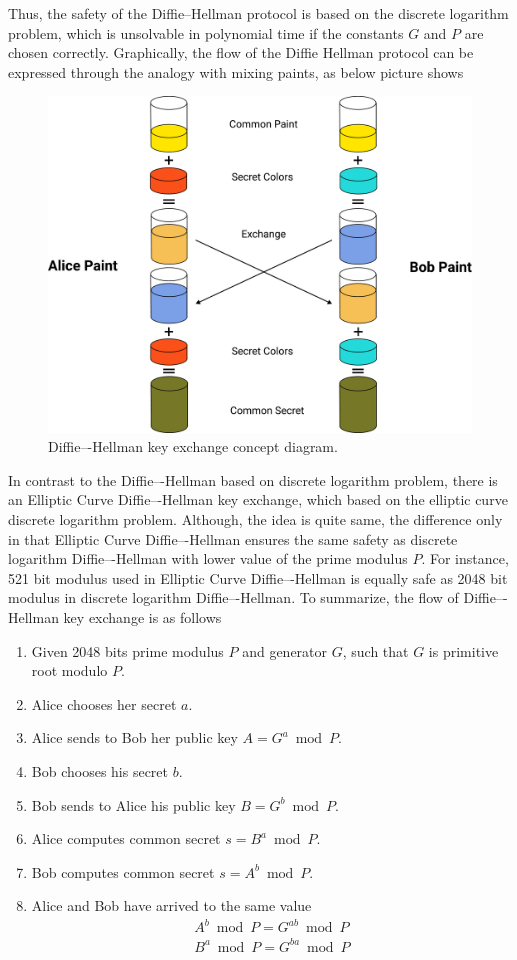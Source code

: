 Thus, the safety of the Diffie--Hellman protocol is based on the discrete logarithm problem, which is unsolvable
in polynomial time if the constants $G$ and $P$ are chosen correctly.
Graphically, the flow of the Diffie Hellman protocol can be expressed through the
analogy with mixing paints, as below picture shows
\begin{figure}[H]
    \centering
    \includegraphics[width=1\textwidth]{Pictures/07_Diffie-Hellman_keyexchange_concept_diagram}
    \caption{Diffie–-Hellman key exchange concept diagram.}\label{fig:figure4}
\end{figure}
In contrast to the Diffie–-Hellman based on discrete logarithm problem, there is an Elliptic Curve Diffie–-Hellman
key exchange, which based on the elliptic curve discrete logarithm problem.
Although, the idea is quite same, the difference only in that Elliptic Curve Diffie–-Hellman ensures the same safety
as discrete logarithm Diffie–-Hellman with lower value of the prime modulus $P$.
For instance, 521 bit modulus used in Elliptic Curve Diffie–-Hellman is equally safe as 2048 bit modulus in
discrete logarithm Diffie–-Hellman.
To summarize, the flow of Diffie–-Hellman key exchange is as follows
\begin{enumerate}
    \item Given 2048 bits prime modulus $P$ and generator $G$, such that $G$ is primitive root modulo $P$.
    \item Alice chooses her secret $a$.
    \item Alice sends to Bob her public key $A = G^a \bmod P$.
    \item Bob chooses his secret $b$.
    \item Bob sends to Alice his public key $B = G^b \bmod P$.
    \item Alice computes common secret $s = B^a \bmod P$.
    \item Bob computes common secret $s = A^b \bmod P$.
    \item Alice and Bob have arrived to the same value
    \begin{eqnarray*}
        A^b \bmod P = G^{ab} \bmod P \\
        B^a \bmod P = G^{ba} \bmod P
    \end{eqnarray*}
\end{enumerate}

